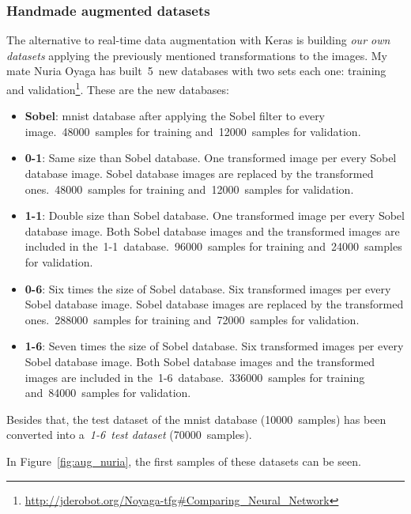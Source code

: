 \subsubsection{Handmade augmented datasets}\label{subsec:handmade}
The alternative to real-time data augmentation with Keras is building \emph{our own datasets} applying the previously mentioned transformations to the images. My mate Nuria Oyaga has built~5~new databases with two sets each one: training and validation\footnote{\url{http://jderobot.org/Noyaga-tfg\#Comparing_Neural_Network}}. These are the new databases: 
\begin{itemize}
	\item \textbf{Sobel}: \gls{mnist} database after applying the Sobel filter to every image.~48000~samples for training and~12000~samples for validation. 
	\item \textbf{0-1}: Same size than Sobel database. One transformed image per every Sobel database image. Sobel database images are replaced by the transformed ones.~48000~samples for training and~12000~samples for validation. 
	\item \textbf{1-1}: Double size than Sobel database. One transformed image per every Sobel database image. Both Sobel database images and the transformed images are included in the~1-1~database.~96000~samples for training and~24000~samples for validation. 
	\item \textbf{0-6}: Six times the size of Sobel database. Six transformed images per every Sobel database image. Sobel database images are replaced by the transformed ones.~288000~samples for training and~72000~samples for validation. 
	\item \textbf{1-6}: Seven times the size of Sobel database. Six transformed images per every Sobel database image. Both Sobel database images and the transformed images are included in the~1-6~database.~336000~samples for training and~84000~samples for validation. 
\end{itemize}

Besides that, the test dataset of the \gls{mnist} database (10000~samples) has been converted into a~\emph{1-6~test dataset} (70000~samples).

In Figure~\ref{fig:aug_nuria}, the first samples of these datasets can be seen.

